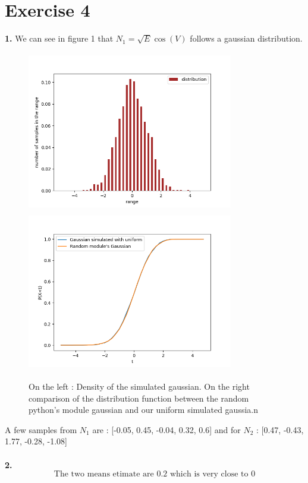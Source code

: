 \documentclass{article}
\begin{document}
\section*{Exercise 4}
\textbf{1.} We can see in figure 1 that $N_1 = \sqrt{E}\cos(V)$ follows a gaussian distribution.
\begin{figure}[H]
    \includegraphics[width = 9cm, height = 7cm]{img/uniform_to_gaussian.png}
    \includegraphics[width = 9cm, height = 7cm]{img/comparison.png}
    \caption{On the left : Density of the simulated gaussian. On the right comparison of the distribution function between the random python's module gaussian and our uniform simulated gaussia.n}
\end{figure}
\noindent A few samples from $N_1$ are : [-0.05, 0.45, -0.04, 0.32, 0.6] and for $N_2$ : [0.47, -0.43, 1.77, -0.28, -1.08]
\\\\
\textbf{2.} $$\boxed{\text{The two means etimate are 0.2 which is very close to 0}}$$
\end{document}
